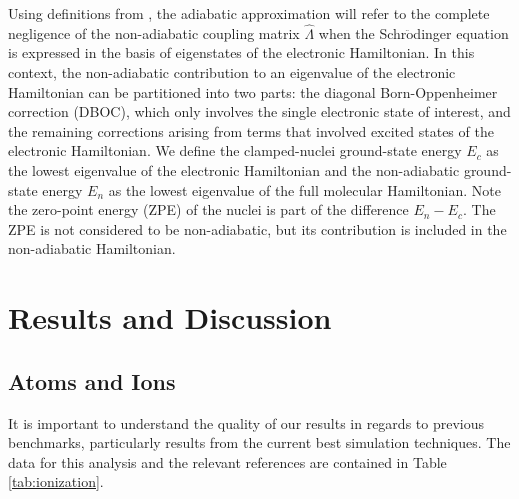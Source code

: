 \documentclass[pra,superscriptaddress,groupedaddress,twocolumn]{revtex4-1}
\begin{document}
Using definitions from \cite{Cederbaum_Review}, the adiabatic approximation 
will refer to the complete negligence of the non-adiabatic coupling matrix 
$\hat{\Lambda}$ when the Schr$\ddot{\text{o}}$dinger equation is expressed 
in the basis of eigenstates of the electronic Hamiltonian. In this context, the
 non-adiabatic contribution to an eigenvalue of the electronic Hamiltonian can 
be partitioned into two parts: the diagonal Born-Oppenheimer correction (DBOC),
 which only involves the single electronic state of interest, and the remaining
corrections  arising from terms that involved excited states of the electronic Hamiltonian. 
 We define the clamped-nuclei ground-state energy $E_c$ as the lowest eigenvalue of the electronic Hamiltonian and the non-adiabatic ground-state energy $E_n$ as the lowest eigenvalue of the full molecular Hamiltonian. Note the zero-point energy (ZPE) of the nuclei is part of the difference $E_n-E_c$. The ZPE is not considered to be non-adiabatic, but its contribution is included in the non-adiabatic Hamiltonian.

\section{Results and Discussion}



\subsection{Atoms and Ions}

It is important to understand the quality of our results in regards to previous benchmarks, particularly results from the current best simulation techniques. The data for this analysis and the relevant references are contained in Table \ref{tab:ionization}. 
\end{document}
